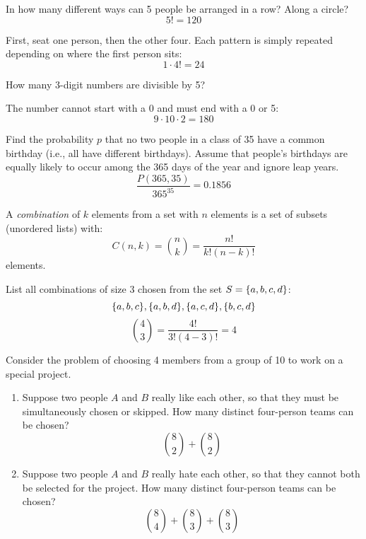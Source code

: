\documentclass[letterpaper,12pt,fleqn]{article}
\begin{document}
\begin{example}
  In how many different ways can 5 people be arranged in a row?  Along a circle?
  \[5!=120\]

  First, seat one person, then the other four.  Each pattern is simply repeated depending on where the first person sits:
  \[1\cdot4!=24\]
\end{example}

\begin{example}
  How many 3-digit numbers are divisible by 5?

  The number cannot start with a 0 and must end with a 0 or 5:
  \[9\cdot10\cdot2=180\]
\end{example}

\begin{example}
  Find the probability \(p\) that no two people in a class of 35 have a common birthday (i.e., all have different birthdays).
  Assume that people's birthdays are equally likely to occur among the 365 days of the year and ignore leap years.
  \[\frac{P(365,35)}{365^{35}}=0.1856\]
\end{example}

\begin{definition}[Combination]
  A \emph{combination} of \(k\) elements from a set with \(n\) elements is a set of subsets (unordered lists) with:
  \[C(n,k)=\binom{n}{k}=\frac{n!}{k!(n-k)!}\]
  elements.
\end{definition}

\begin{example}
  List all combinations of size 3 chosen from the set \(S=\{a,b,c,d\}\):
  \[\{a,b,c\}, \{a,b,d\}, \{a,c,d\}, \{b,c,d\}\]
  \[\binom{4}{3}=\frac{4!}{3!(4-3)!}=4\]
\end{example}

\begin{example}
  Consider the problem of choosing 4 members from a group of 10 to work on a special project.
  \begin{enumerate}[label={\alph*)}]
  \item Suppose two people \(A\) and \(B\) really like each other, so that they must be simultaneously chosen or skipped.  How
    many distinct four-person teams can be chosen?
    \[\binom{8}{2}+\binom{8}{2}\]

  \item Suppose two people \(A\) and \(B\) really hate each other, so that they cannot both be selected for the project.  How
    many distinct four-person teams can be chosen?
    \[\binom{8}{4}+\binom{8}{3}+\binom{8}{3}\]
  \end{enumerate}
\end{example}
\end{document}
